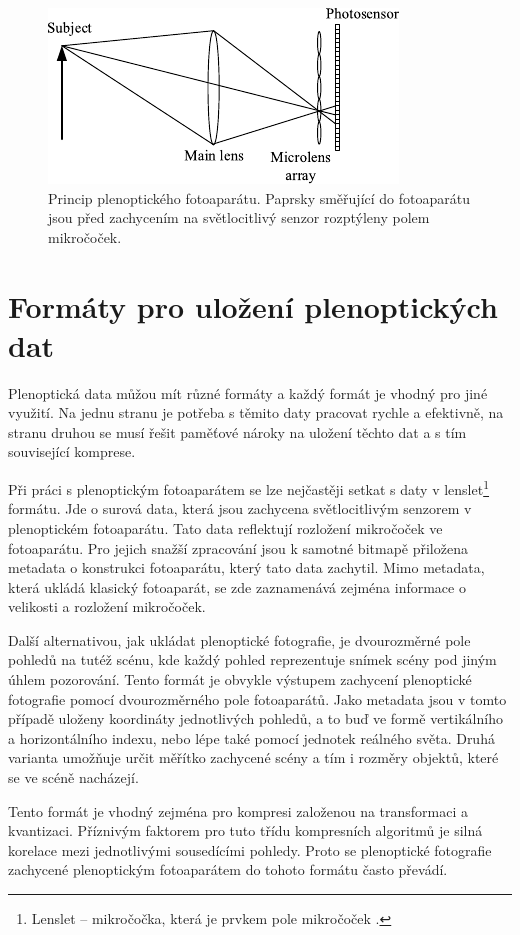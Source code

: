 \begin{figure}[h]
	\centering
		\includegraphics[width=.4\textwidth]{obrazky-figures/pleno-cam.pdf}
		\caption{Princip plenoptického fotoaparátu. Paprsky směřující do fotoaparátu jsou před zachycením na světlocitlivý senzor rozptýleny polem mikročoček.}
		\label{plenoPrincip}
\end{figure}

\section{Formáty pro uložení plenoptických dat}
\label{light-field-formats}
Plenoptická data můžou mít různé formáty a každý formát je vhodný pro jiné využití.
Na jednu stranu je potřeba s těmito daty pracovat rychle a efektivně, na stranu druhou se musí řešit paměťové nároky na uložení těchto dat a s tím související komprese.

Při práci s plenoptickým fotoaparátem se lze nejčastěji setkat s daty v lenslet\footnote{Lenslet -- mikročočka, která je prvkem pole mikročoček \cite{lenslet}.} formátu. Jde o surová data, která jsou zachycena světlocitlivým senzorem v plenoptickém fotoaparátu.
Tato data reflektují rozložení mikročoček ve fotoaparátu.
Pro jejich snažší zpracování jsou k samotné bitmapě přiložena metadata o konstrukci fotoaparátu, který tato data zachytil.
Mimo metadata, která ukládá klasický fotoaparát, se zde zaznamenává zejména informace o velikosti a rozložení mikročoček.

Další alternativou, jak ukládat plenoptické fotografie, je dvourozměrné pole pohledů na tutéž scénu, kde každý pohled reprezentuje snímek scény pod jiným úhlem pozorování.
Tento formát je obvykle výstupem zachycení plenoptické fotografie pomocí dvourozměrného pole fotoaparátů.
Jako metadata jsou v tomto případě uloženy koordináty jednotlivých pohledů, a to buď ve formě vertikálního a horizontálního indexu, nebo lépe také pomocí jednotek reálného světa.
Druhá varianta umožňuje určit měřítko zachycené scény a tím i rozměry objektů, které se ve scéně nacházejí.

Tento formát je vhodný zejména pro kompresi založenou na transformaci a kvantizaci.
Příznivým faktorem pro tuto třídu kompresních algoritmů je silná korelace mezi jednotlivými sousedícími pohledy.
Proto se plenoptické fotografie zachycené plenoptickým fotoaparátem do tohoto formátu často převádí.

